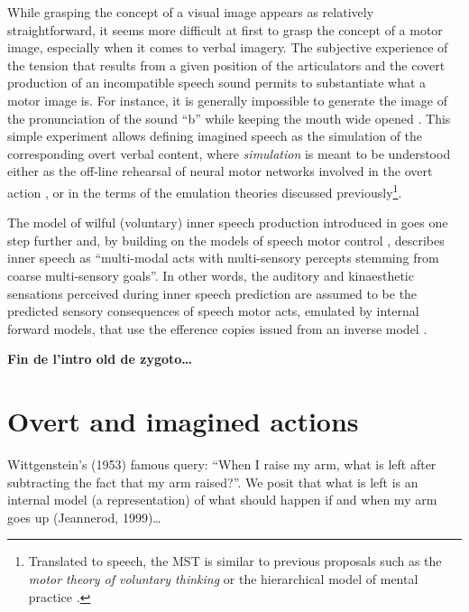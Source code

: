 \documentclass[a4paper,11pt,oneside,oldfontcommands]{memoir}
\let\rmarkdownfootnote\footnote%
\def\footnote{\protect\rmarkdownfootnote}
\begin{document}
While grasping the concept of a visual image appears as relatively
straightforward, it seems more difficult at first to grasp the concept
of a motor image, especially when it comes to verbal imagery. The
subjective experience of the tension that results from a given position
of the articulators and the covert production of an incompatible speech
sound permits to substantiate what a motor image is. For instance, it is
generally impossible to generate the image of the pronunciation of the
sound ``b'' while keeping the mouth wide opened
\citep[e.g.,][]{binet_psychologie_1886, stricker_studien_1880}. This
simple experiment allows defining imagined speech as the simulation of
the corresponding overt verbal content, where \emph{simulation} is meant
to be understood either as the off-line rehearsal of neural motor
networks involved in the overt action \citep{jeannerod_motor_2006}, or
in the terms of the emulation theories discussed previously\footnote{Translated
  to speech, the MST is similar to previous proposals such as the
  \emph{motor theory of voluntary thinking} \citep{cohen_motor_1986} or
  the hierarchical model of mental practice \citep{mackay_problem_1981}.}.

The model of wilful (voluntary) inner speech production introduced in
\citet{loevenbruck_cognitive_2018} goes one step further and, by
building on the models of speech motor control
\citep[e.g.,][]{houde_speech_2011, wolpert_internal_1995}, describes
inner speech as ``multi-modal acts with multi-sensory percepts stemming
from coarse multi-sensory goals''. In other words, the auditory and
kinaesthetic sensations perceived during inner speech prediction are
assumed to be the predicted sensory consequences of speech motor acts,
emulated by internal forward models, that use the efference copies
issued from an inverse model \citep[this proposal shares similarities
with the emulation model of motor imagery discussed
earlier,][]{grush_emulation_2004}.

\textbf{Fin de l'intro old de zygoto\ldots{}}

\section{Overt and imagined actions}\label{overt-and-imagined-actions}

Wittgenstein's (1953) famous query: ``When I raise my arm, what is left
after subtracting the fact that my arm raised?''. We posit that what is
left is an internal model (a representation) of what should happen if
and when my arm goes up (Jeannerod, 1999)\ldots{}
\end{document}
